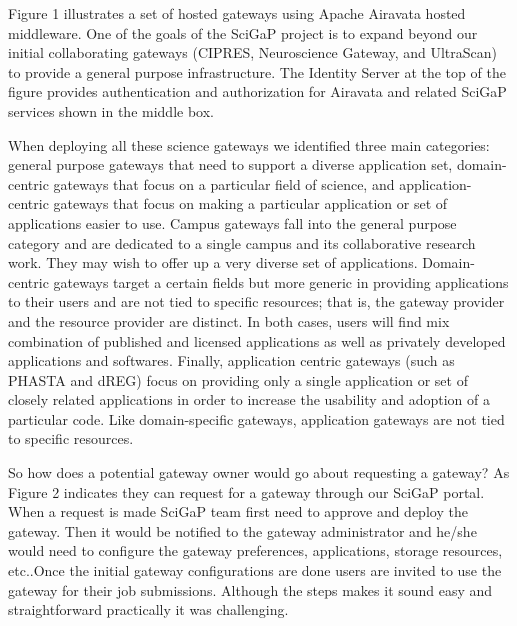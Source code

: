 \documentclass[sigconf]{acmart}
\begin{document}
Figure 1 illustrates a set of hosted gateways using Apache Airavata hosted middleware. One of the goals of the SciGaP project is to expand beyond our initial collaborating gateways (CIPRES, Neuroscience Gateway, and UltraScan) to provide a general purpose infrastructure.  The Identity Server \cite{nakandala2016apache} at the top of the figure provides authentication and authorization for Airavata and related SciGaP services shown in the middle box. 

When deploying all these science gateways we identified three main categories:  general purpose gateways that need to support a diverse application set, domain-centric gateways that focus on a particular field of science, and application-centric gateways that focus on making a particular application or set of applications easier to use. Campus gateways fall into the general purpose category and are dedicated to a single campus and its collaborative research work. They may wish to offer up a very diverse set of applications.  Domain-centric gateways target a certain fields but more generic in providing applications to their users and are not tied to specific resources; that is, the gateway provider and the resource provider are distinct. In both cases, users will find mix combination of published and licensed applications as well as privately developed applications and softwares. Finally, application centric gateways (such as PHASTA and dREG) focus on providing only a single application or set of closely related applications in order to increase the usability and adoption of a particular code. Like domain-specific gateways, application gateways are not tied to specific resources. 

So how does a potential gateway owner would go about requesting a gateway? As Figure 2 indicates they can request for a gateway through our SciGaP portal. When a request is made SciGaP team first need to approve and deploy the gateway. Then it would be notified to the gateway administrator  and he/she would need to configure the gateway preferences, applications, storage resources, etc..Once the initial gateway configurations are done users are invited to use the gateway for their job submissions. Although the steps makes it sound easy and straightforward practically it was challenging.
\end{document}
